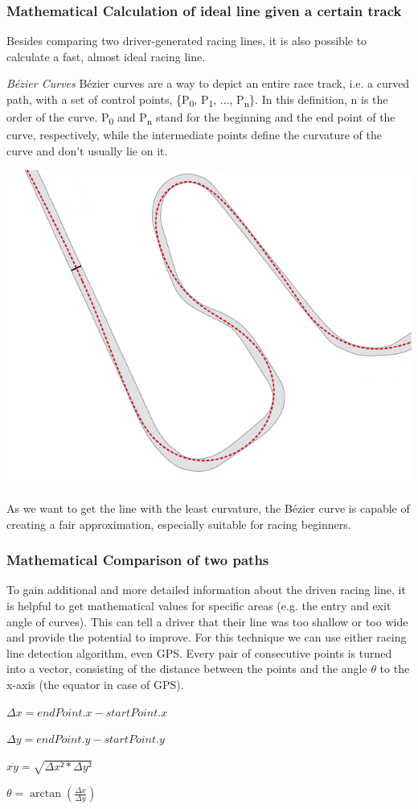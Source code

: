 \subsubsection{Mathematical Calculation of ideal line given a certain track}
Besides comparing two driver-generated racing lines, it is also possible to calculate a fast, almost ideal racing line.

\textit{Bézier Curves}
Bézier curves are a way to depict an entire race track, i.e. a curved path, with a set of control points, \{P\textsubscript{0}, P\textsubscript{1}, ..., P\textsubscript{n}\}. In this definition, n is the order of the curve. P\textsubscript{0} and P\textsubscript{n} stand for the beginning and the end point of the curve, respectively, while the intermediate points define the curvature of the curve and don't usually lie on it.

\includegraphics[width=\textwidth]{bezier_track}

As we want to get the line with the least curvature, the Bézier curve is capable of creating a fair approximation, especially suitable for racing beginners.


\subsubsection{Mathematical Comparison of two paths}
To gain additional and more detailed information about the driven racing line, it is helpful to get mathematical values for specific areas (e.g. the entry and exit angle of curves). This can tell a driver that their line was too shallow or too wide and provide the potential to improve.
For this technique we can use either racing line detection algorithm, even GPS. Every pair of consecutive points is turned into a vector, consisting of the distance between the points and the angle $\theta$ to the x-axis (the equator in case of GPS).
\begin{center}
$\Delta x = endPoint.x - startPoint.x$

$\Delta y = endPoint.y - startPoint.y$

$\overline{xy} = \sqrt{\Delta x² * \Delta y²}$

$\theta = \arctan(\frac{\Delta x}{\Delta y})$ 
\end{center}

